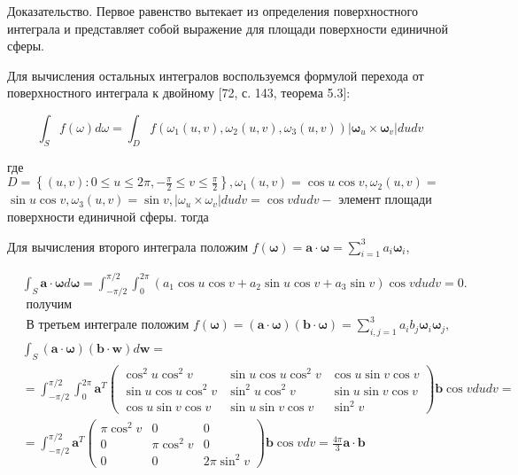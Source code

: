 \documentclass[10pt]{article}
\begin{document}
Доказательство. Первое равенство вытекает из определения поверхностного интеграла и представляет собой выражение для площади поверхности единичной сферы.

Для вычисления остальных интегралов воспользуемся формулой перехода от поверхностного интеграла к двойному [72, с. 143, теорема 5.3]:

$$
\int_{S} f(\omega) d \omega=\int_{D} f\left(\omega_{1}(u, v), \omega_{2}(u, v), \omega_{3}(u, v)\right)\left|\boldsymbol{\omega}_{u} \times \boldsymbol{\omega}_{v}\right| d u d v
$$

где $D=\left\{(u, v): 0 \leqslant u \leqslant 2 \pi,-\frac{\pi}{2} \leqslant v \leqslant \frac{\pi}{2}\right\}, \omega_{1}(u, v)=\cos u \cos v, \omega_{2}(u, v)=$ $\sin u \cos v, \omega_{3}(u, v)=\sin v,\left|\omega_{u} \times \omega_{v}\right| d u d v=\cos v d u d v-$ элемент площади поверхности единичной сферы. тогда

Для вычисления второго интеграла положим $f(\boldsymbol{\omega})=\mathbf{a} \cdot \boldsymbol{\omega}=\sum_{i=1}^{3} a_{i} \boldsymbol{\omega}_{i}$,

$$
\begin{aligned}
& \int_{S} \mathbf{a} \cdot \boldsymbol{\omega} d \boldsymbol{\omega}=\int_{-\pi / 2}^{\pi / 2} \int_{0}^{2 \pi}\left(a_{1} \cos u \cos v+a_{2} \sin u \cos v+a_{3} \sin v\right) \cos v d u d v=0 . \\
& \text { получим } \\
& \text { В третьем интеграле положим } f(\boldsymbol{\omega})=(\mathbf{a} \cdot \boldsymbol{\omega})(\mathbf{b} \cdot \boldsymbol{\omega})=\sum_{i, j=1}^{3} a_{i} b_{j} \boldsymbol{\omega}_{i} \boldsymbol{\omega}_{j} \text {, } \\
& \int_{S}(\mathbf{a} \cdot \boldsymbol{\omega})(\mathbf{b} \cdot \boldsymbol{w}) d \boldsymbol{w}= \\
& =\int_{-\pi / 2}^{\pi / 2} \int_{0}^{2 \pi} \mathbf{a}^{T}\left(\begin{array}{ccc}\cos ^{2} u \cos ^{2} v & \sin u \cos u \cos ^{2} v & \cos u \sin v \cos v \\\sin u \cos u \cos ^{2} v & \sin ^{2} u \cos ^{2} v & \sin u \sin v \cos v \\\cos u \sin v \cos v & \sin u \sin v \cos v & \sin ^{2} v\end{array}\right) \mathbf{b} \cos v d u d v= \\
& =\int_{-\pi / 2}^{\pi / 2} \mathbf{a}^{T}\left(\begin{array}{ccc}\pi \cos ^{2} v & 0 & 0 \\0 & \pi \cos ^{2} v & 0 \\0 & 0 & 2 \pi \sin ^{2} v\end{array}\right) \mathbf{b} \cos v d v=\frac{4 \pi}{3} \mathbf{a} \cdot \mathbf{b}
\end{aligned}
$$
\end{document}
